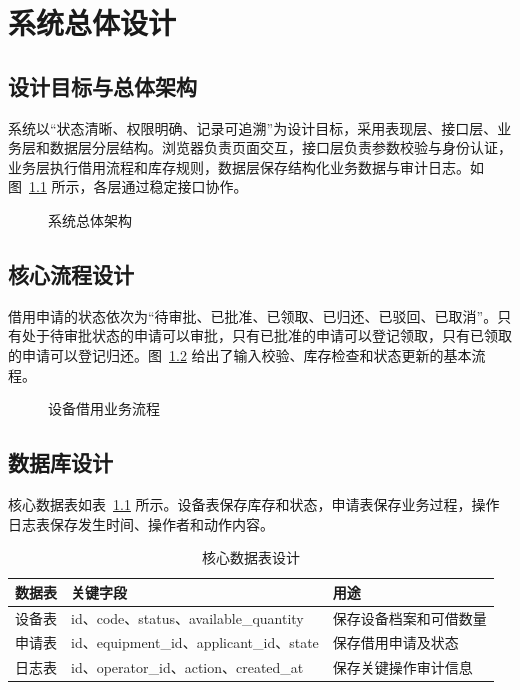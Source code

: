 \chapter{系统总体设计}
\section{设计目标与总体架构}
系统以“状态清晰、权限明确、记录可追溯”为设计目标，采用表现层、接口层、业务层和数据层分层结构。浏览器负责页面交互，接口层负责参数校验与身份认证，业务层执行借用流程和库存规则，数据层保存结构化业务数据与审计日志。如图~\ref{fig:3-1} 所示，各层通过稳定接口协作。
\begin{figure}[H]\centering{}\caption{系统总体架构}\label{fig:3-1}\end{figure}
\section{核心流程设计}
借用申请的状态依次为“待审批、已批准、已领取、已归还、已驳回、已取消”。只有处于待审批状态的申请可以审批，只有已批准的申请可以登记领取，只有已领取的申请可以登记归还。图~\ref{fig:3-2} 给出了输入校验、库存检查和状态更新的基本流程。
\begin{figure}[H]\centering{}\caption{设备借用业务流程}\label{fig:3-2}\end{figure}
\section{数据库设计}
核心数据表如表~\ref{tab:3-1} 所示。设备表保存库存和状态，申请表保存业务过程，操作日志表保存发生时间、操作者和动作内容。
\begingroup{}\setlength{\tabcolsep}{3pt}\renewcommand{\arraystretch}{1.25}
\begin{longtable}{|>{\RaggedRight\arraybackslash}p{}|>{\RaggedRight\arraybackslash}p{}|>{\RaggedRight\arraybackslash}p{}|}
\caption{核心数据表设计}\label{tab:3-1}\\\hline
\textbf{数据表} & \textbf{关键字段} & \textbf{用途} \\\hline
\endfirsthead
设备表 & id、code、status、available\_quantity & 保存设备档案和可借数量 \\\hline
申请表 & id、equipment\_id、applicant\_id、state & 保存借用申请及状态 \\\hline
日志表 & id、operator\_id、action、created\_at & 保存关键操作审计信息 \\\hline
\end{longtable}\endgroup

